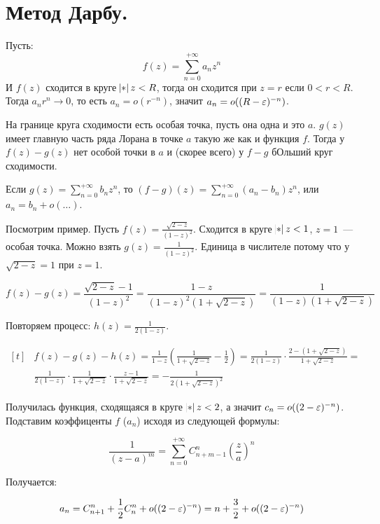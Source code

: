 \section{Метод Дарбу.}

Пусть:
$$f(z) = \sum\limits_{n=0}^{+\infty} a_nz^n$$ 
И $f(z)$ сходится в круге $\abs z < R$, тогда он сходится при
$z = r$ если $0 < r < R$. Тогда $a_nr^n \to 0$,
то есть $a_n = o(r^{-n})$,
значит $a_n = o((R-\varepsilon)^{-n})$.

На границе круга сходимости есть особая точка,
пусть она одна и это $a$.
$g(z)$ имеет главную часть ряда Лорана
в точке $a$ такую же как и функция $f$.
Тогда у $f(z)-g(z)$ нет особой точки в $a$
и (скорее всего) у $f-g$ бОльший круг сходимости.

Если $g(z) = \sum\limits_{n=0}^{+\infty}
    b_nz^n$, то $(f-g)(z) = \sum\limits_{n=0}^{+\infty} (a_n-b_n) z^n$,
или $a_n = b_n + o (\ldots)$.

Посмотрим пример. Пусть $f(z) = \frac{\sqrt{2-z}}{(1-z)^2}$.
Сходится в круге $\abs z < 1$, $z = 1$~--- особая точка.
Можно взять $g(z) = \frac{1}{(1-z)^2}$.
Единица в числителе потому что у $\sqrt{2-z} = 1$ при $z = 1$.

\[
    f(z) - g(z) = \frac{\sqrt{2-z}-1}{(1-z)^2}
    = \frac{1-z}{(1-z)^2(1+\sqrt{2-z})}
    = \frac{1}{(1-z)(1+\sqrt{2-z})}
\]

Повторяем процесс: $h(z) = \frac{1}{2(1-z)}$.

\[
    \begin{aligned}[t]
            & f(z) - g(z) - h(z) = \frac{1}{1-z}
        \left(\frac{1}{1+\sqrt{2-z}} - \frac{1}{2}\right)
        = \frac{1}{2(1-z)} \cdot \frac{2-(1+\sqrt{2-z})}{1+\sqrt{2-z}}
        =                                                \\
            & \frac{1}{2(1-z)} \cdot \frac{1}{1+\sqrt{2-z}}
        \cdot \frac{z-1}{1+\sqrt{2-z}}
        = -\frac{1}{2(1+\sqrt{2-z})^2}
    \end{aligned}
\]

Получилась функция, сходящаяся в круге $\abs z < 2$,
а значит $c_n = o((2-\varepsilon)^{-n})$. Подставим коэффиценты
$f$ ($a_n$) исходя из следующей формулы:

\[
    \frac{1}{(z-a)^m} = \sum\limits_{n=0}^{+\infty}
    C_{n+m-1}^{n}
    \left(\frac{z}{a} \right)^n
\]

Получается:

\[
    a_n = C_{n+1}^n + \frac{1}{2}C_n^n + o((2-\varepsilon)^{-n})
    = n + \frac{3}{2} + o((2-\varepsilon)^{-n})
\]

\newpage
